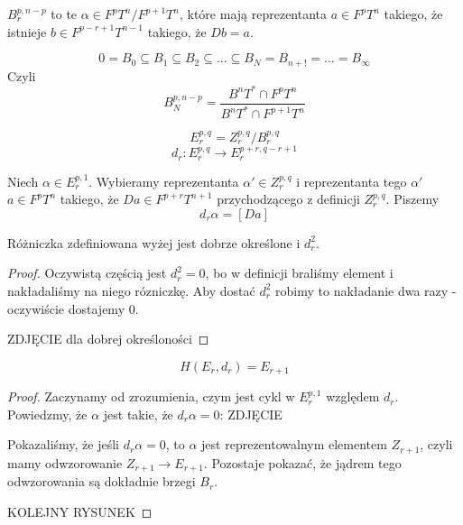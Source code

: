 \begin{definition}[brzegi]
  $B_r^{p, n-p}$ to te $\alpha\in F^pT^n/F^{p+1}T^n$, które mają reprezentanta $a\in F^pT^n$ takiego, że istnieje $b\in F^{p-r+1}T^{n-1}$ takiego, że $Db=a$.

  \begin{center}\end{center}

  $$0=B_0\subseteq B_1\subseteq B_2\subseteq ... \subseteq B_N=B_{n+!}=...=B_\infty$$
  Czyli 
  $$B_{N}^{p, n-p}=\frac{B^nT^*\cap F^pT^n}{B^nT^*\cap F^{p+1}T^n}$$
\end{definition}

\begin{definition}
  $$E_r^{p,q}=Z_r^{p,q}/B_r^{p,q}$$
  $$d_r:E_r^{p,q}\to E_r^{p+r, q-r+1}$$

  Niech $\alpha\in E_r^{p,1}$. Wybieramy reprezentanta $\alpha'\in Z_r^{p,q}$ i reprezentanta tego $\alpha'$ $a\in F^pT^n$ takiego, że $Da\in F^{p+r}T^{n+1}$ przychodzącego z definicji $Z_r^{p,q}$. Piszemy
  $$d_r\alpha=[Da]$$
\end{definition}

\begin{fact}
  Różniczka zdefiniowana wyżej jest dobrze określone i $d_r^2$.
\end{fact}

\begin{proof}
  Oczywistą częścią jest $d_r^2=0$, bo w definicji braliśmy element i nakładaliśmy na niego rózniczkę. Aby dostać $d_r^2$ robimy to nakładanie dwa razy - oczywiście dostajemy $0$.

  {\large\color{red}ZDJĘCIE dla dobrej określoności}
\end{proof}

\begin{fact}
  $$H(E_r, d_r)=E_{r+1}$$
\end{fact}

\begin{proof}
  Zaczynamy od zrozumienia, czym jest cykl w $E_r^{p,1}$ względem $d_r$. Powiedzmy, że $\alpha$ jest takie, że $d_r\alpha=0$:
  {\large\color{red}ZDJĘCIE}

  Pokazaliśmy, że jeśli $d_r\alpha=0$, to $\alpha$ jest reprezentowalnym elementem $Z_{r+1}$, czyli mamy odwzorowanie $Z_{r+1}\to E_{r+1}$. Pozostaje pokazać, że jądrem tego odwzorowania są dokładnie brzegi $B_r$.

  {\large\color{red}KOLEJNY RYSUNEK}
\end{proof}

